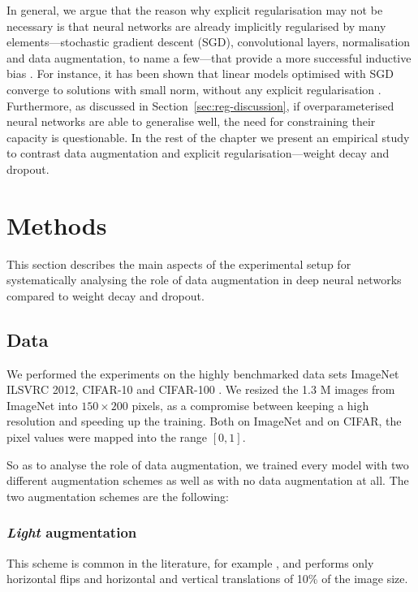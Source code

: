 {In general, we argue that the reason why explicit regularisation may not be necessary is that neural networks are already implicitly regularised by many elements---stochastic gradient descent (SGD), convolutional layers, normalisation and data augmentation, to name a few---that provide a more successful inductive bias \citep{neyshabur2014implicitreg}. For instance, it has been shown that linear models optimised with SGD converge to solutions with small norm, without any explicit regularisation \citep{zhang2016understandingdl}. Furthermore, as discussed in Section~\ref{sec:reg-discussion}, if overparameterised neural networks are able to generalise well, the need for constraining their capacity is questionable. In the rest of the chapter we present an empirical study to contrast data augmentation and explicit regularisation---weight decay and dropout.

\section{Methods}
\label{sec:daugreg-methods}
This section describes the main aspects of the experimental setup for systematically analysing the role of data augmentation in deep neural networks compared to weight decay and dropout.

\subsection{Data}
\label{sec:daugreg-methods_data}
We performed the experiments on the highly benchmarked data sets ImageNet \citep{russakovsky2015imagenet} ILSVRC 2012, CIFAR-10 and CIFAR-100 \citep{krizhevsky2009cifar}. We resized the 1.3 M images from ImageNet into $150\times200$ pixels, as a compromise between keeping a high resolution and speeding up the training. Both on ImageNet and on CIFAR, the pixel values were mapped into the range $[0, 1]$.  

So as to analyse the role of data augmentation, we trained every model with two different augmentation schemes as well as with no data augmentation at all. The two augmentation schemes are the following:

\subsubsection{\textit{Light} augmentation}
This scheme is common in the literature, for example \citep{goodfellow2013maxout, springenberg2014allcnn}, and performs only horizontal flips and horizontal and vertical translations of 10\% of the image size. 

}
